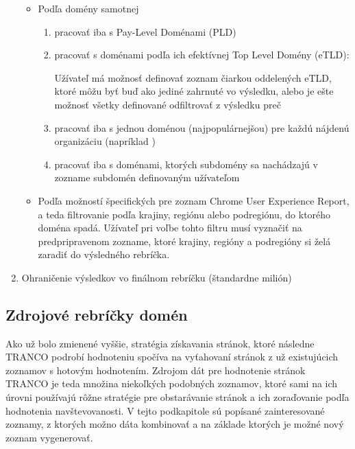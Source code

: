 \begin{enumerate}
\begin{itemize}
        \item Podľa domény samotnej
        \begin{enumerate}
            \item pracovať iba s Pay-Level Doménami (PLD)
            \item pracovať s doménami podľa ich efektívnej Top Level Domény (eTLD):
            
            Užívateľ má možnosť definovať zoznam čiarkou oddelených eTLD, ktoré môžu byť buď ako jediné zahrnuté vo
            výsledku, alebo je ešte možnosť všetky definované odfiltrovať z výsledku preč
            
            \item pracovať iba s jednou doménou (najpopulárnejšou) pre každú nájdenú organizáciu (napríklad )
            \item pracovať iba s doménami, ktorých subdomény sa nachádzajú v zozname subdomén definovaným užívateľom 
        \end{enumerate}

        \item Podľa možností špecifických pre zoznam Chrome User Experience Report, a teda filtrovanie podľa krajiny, regiónu alebo podregiónu, do ktorého doména spadá. Užívateľ pri voľbe tohto filtru musí vyznačiť na predpripravenom zozname, ktoré krajiny, regióny a podregióny si želá zaradiť do výsledného rebríčka.
    \end{itemize}

    \item Ohraničenie výsledkov vo finálnom rebríčku (štandardne milión)
    
\end{enumerate}



\subsection{Zdrojové rebríčky domén}
\label{tranco-source-rankings}

Ako už bolo zmienené vyššie, stratégia získavania stránok, ktoré následne TRANCO podrobí hodnoteniu spočíva na vyťahovaní stránok z už existujúcich zoznamov s hotovým hodnotením. 
Zdrojom dát pre hodnotenie stránok TRANCO je teda množina niekoľkých podobných zoznamov, ktoré sami na ich úrovni používajú rôžne stratégie pre obstarávanie stránok a ich zoraďovanie 
podľa hodnotenia navštevovanosti. \cite{tranco-methodology} V tejto podkapitole sú popísané zainteresované zoznamy, z ktorých možno dáta kombinovať 
a na základe ktorých je možné nový zoznam vygenerovať.

